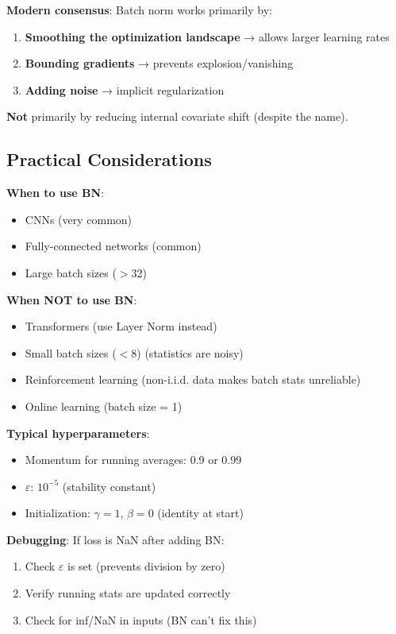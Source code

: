 \textbf{Modern consensus}: Batch norm works primarily by:
\begin{enumerate}
\item \textbf{Smoothing the optimization landscape} → allows larger learning rates
\item \textbf{Bounding gradients} → prevents explosion/vanishing
\item \textbf{Adding noise} → implicit regularization
\end{enumerate}

\textbf{Not} primarily by reducing internal covariate shift (despite the name).

\subsection{Practical Considerations}

\textbf{When to use BN}:
\begin{itemize}
\item CNNs (very common)
\item Fully-connected networks (common)
\item Large batch sizes ($>$32)
\end{itemize}

\textbf{When NOT to use BN}:
\begin{itemize}
\item Transformers (use Layer Norm instead)
\item Small batch sizes ($<$8) (statistics are noisy)
\item Reinforcement learning (non-i.i.d. data makes batch stats unreliable)
\item Online learning (batch size = 1)
\end{itemize}

\textbf{Typical hyperparameters}:
\begin{itemize}
\item Momentum for running averages: 0.9 or 0.99
\item $\varepsilon$: $10^{-5}$ (stability constant)
\item Initialization: $\gamma = 1$, $\beta = 0$ (identity at start)
\end{itemize}

\textbf{Debugging}: If loss is NaN after adding BN:
\begin{enumerate}
\item Check $\varepsilon$ is set (prevents division by zero)
\item Verify running stats are updated correctly
\item Check for inf/NaN in inputs (BN can't fix this)
\end{enumerate}


